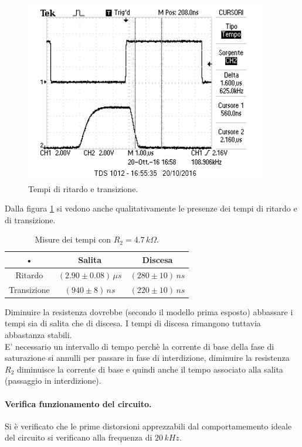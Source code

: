\documentclass[10pt,a4paper]{article}
\begin{document}
\begin{figure}[!htb]
  \centering
  \includegraphics[scale=0.7]{condensatore.png} 
\caption{Tempi di ritardo e transizione.} \label{condensatore}
\end{figure} 

Dalla figura \ref{condensatore} si vedono anche qualitativamente le presenze dei tempi di ritardo e di transizione.\\

\begin{table}[!htb]\centering
\begin{tabular}{|c|c|c|}
\hline 
• & Salita & Discesa \\ 
\hline 
Ritardo & $(2.90\pm0.08)\, \mu s$ & $(280\pm10) \, ns$ \\ 
\hline 
Transizione & $(940\pm8)\,ns$ & $(220\pm10) \, ns$ \\ 
\hline 
\end{tabular} 
\caption{Misure dei tempi con $R_2 = 4.7 \, k\Omega$.} \label{tempi2}
\end{table}

Diminuire la resistenza dovrebbe (secondo il modello prima esposto) abbassare i tempi sia di salita che di discesa. I tempi di discesa rimangono tuttavia abbastanza stabili.\\
E' necessario un intervallo di tempo perchè la corrente di base della fase di saturazione si annulli per passare in fase di interdizione, diminuire la resistenza $R_2$ diminuisce la corrente di base e quindi anche il tempo associato alla salita (passaggio in interdizione). 

\paragraph{Verifica funzionamento del circuito.}
Si è verificato che le prime distorsioni apprezzabili dal comportamemento ideale del circuito si verificano alla frequenza di $20 \, kHz$.
\end{document}
